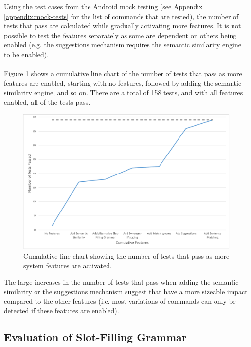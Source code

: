 \documentclass[11pt]{article}
\begin{document}
Using the test cases from the Android mock testing (see Appendix \ref{appendix:mock-tests} for the list of commands that are tested), the number of tests that pass are calculated while gradually activating more features. It is not possible to test the features separately as some are dependent on others being enabled (e.g. the suggestions mechanism requires the semantic similarity engine to be enabled).
\\
\\
Figure \ref{fig:line-chart-features} shows a cumulative line chart of the number of tests that pass as more features are enabled, starting with no features, followed by adding the semantic similarity engine, and so on. There are a total of 158 tests, and with all features enabled, all of the tests pass.

\begin{figure}[H]
\begin{center}
  \includegraphics[width=\linewidth]{feature-evaluation.pdf}
  \caption{Cumulative line chart showing the number of tests that pass as more system features are activated.}
  \label{fig:line-chart-features}
  \end{center}
\end{figure}

The large increases in the number of tests that pass when adding the semantic similarity or the suggestions mechanism suggest that have a more sizeable impact compared to the other features (i.e. most variations of commands can only be detected if these features are enabled).

\subsection{Evaluation of Slot-Filling Grammar}
\label{section:eval-sfs}
\end{document}

